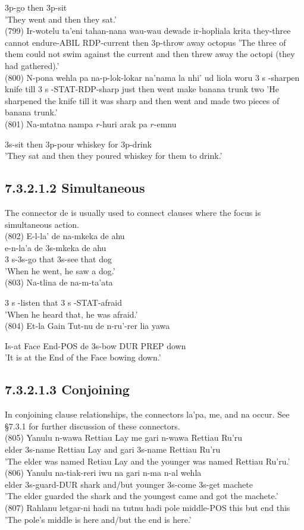 \documentclass[10pt]{article}
\begin{document}
3p-go then 3p-sit\\
'They went and then they sat.'\\
(799) Ir-wotelu ta'eni tahan-nana wau-wau dewade ir-hopliala krita they-three cannot endure-ABIL RDP-current then 3p-throw away octopus 'The three of them could not swim against the current and then threw away the octopi (they had gathered).'\\
(800) N-pona wehla pa na-p-lok-lokar na'nama la nhi' ud liola woru 3 s -sharpen knife till 3 s -STAT-RDP-sharp just then went make banana trunk two 'He sharpened the knife till it was sharp and then went and made two pieces of banana trunk.'\\
(801) Na-mtatna nampa \(r\)-huri arak pa \(r\)-emnu

3s-sit then 3p-pour whiskey for 3p-drink\\
'They sat and then they poured whiskey for them to drink.'

\subsection*{7.3.2.1.2 Simultaneous}
The connector de is usually used to connect clauses where the focus is simultaneous action.\\
(802) E-l-la’ de na-mkeka de ahu\\
e-n-la'a de 3s-mkeka de ahu\\
3 s-3s-go that 3s-see that dog\\
'When he went, he saw a dog.'\\
(803) Na-tlina de na-m-ta'ata

3 s -listen that 3 s -STAT-afraid\\
'When he heard that, he was afraid.'\\
(804) Et-la Gain Tut-nu de n-ru'-rer lia yawa

Is-at Face End-POS de 3s-bow DUR PREP down\\
'It is at the End of the Face bowing down.'

\subsection*{7.3.2.1.3 Conjoining}
In conjoining clause relationships, the connectors la'pa, me, and na occur. See §7.3.1 for further discussion of these connectors.\\
(805) Yanulu n-wawa Rettiau Lay me gari n-wawa Rettiau Ru'ru\\
elder 3s-name Rettiau Lay and gari 3s-name Rettiau Ru'ru\\
'The elder was named Retiau Lay and the younger was named Rettiau Ru'ru.'\\
(806) Yanulu na-tiak-reri iwu na gari n-ma n-al wehla\\
elder 3s-guard-DUR shark and/but younger 3s-come 3s-get machete\\
'The elder guarded the shark and the youngest came and got the machete.'\\
(807) Rahlanu letgar-ni hadi na tutnu hadi pole middle-POS this but end this 'The pole's middle is here and/but the end is here.'
\end{document}
